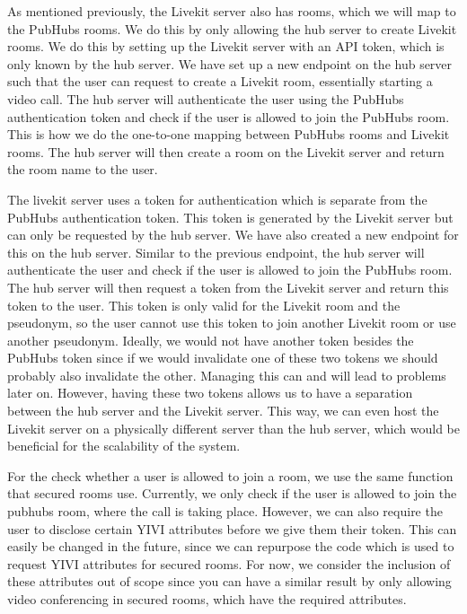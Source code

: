 \documentclass{report}
\begin{document}
As mentioned previously, the Livekit server also has rooms, which we will map to the PubHubs rooms. We do this by
only allowing the hub server to create Livekit rooms. We do this by setting up the Livekit server with an API token,
which is only known by the hub server. We have set up a new endpoint on the hub server such that the user can request
to create a Livekit room, essentially starting a video call. The hub server will authenticate the user using the PubHubs
authentication token and check if the user is allowed to join the PubHubs room. This is how we do the one-to-one mapping
between PubHubs rooms and Livekit rooms. The hub server will then create a room on the Livekit server and return the
room name to the user.

The livekit server uses a token for authentication which is separate from the PubHubs authentication token.
This token is generated by the Livekit server but can only be requested by the hub server.
We have also created a new endpoint for this on the hub server. Similar to the previous endpoint, the hub server will
authenticate the user and check if the user is allowed to join the PubHubs room. The hub server will then request a
token from the Livekit server and return this token to the user. This token is only valid for the Livekit room and the
pseudonym, so the user cannot use this token to join another Livekit room or use another pseudonym. Ideally, we would
not have another token besides the PubHubs token since if we would invalidate one of these two tokens we should probably
also invalidate the other. Managing this can and will lead to problems later on. However, having these two tokens
allows us to have a separation between the hub server and the Livekit server. This way, we can even host the Livekit
server on a physically different server than the hub server, which would be beneficial for the scalability of the
system.

For the check whether a user is allowed to join a room, we use the same function that secured rooms use. Currently,
we only check if the user is allowed to join the pubhubs room, where the call is taking place. However, we can also
require the user to disclose certain YIVI attributes before we give them their token. This can easily be changed in the
future, since we can repurpose the code which is used to request YIVI attributes for secured rooms. For now, we consider
the inclusion of these attributes out of scope since you can have a similar result by only allowing video conferencing
in secured rooms, which have the required attributes.
\end{document}
